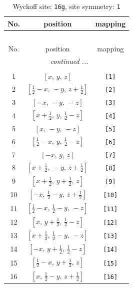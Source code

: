 \documentclass[fleqn,8pt]{jsarticle}
\begin{document}
\begin{longtable}{ccc}
\caption{Wyckoff site: {\tt 16g}, site symmetry: {\tt 1}}
 \\
 \hline \hline
No. & position & mapping \\ \hline \endfirsthead

\multicolumn{2}{l}{\tablename\ \thetable{}} \\
 \hline \hline
No. & position & mapping \\ \hline \endhead

 \hline \hline
\multicolumn{2}{r}{\footnotesize\it continued ...} \\ \endfoot

 \hline \hline
\multicolumn{2}{r}{} \\ \endlastfoot

1 & $\left[ x,\, y,\, z \right]$ & {\tt [1]} \\ \hline
2 & $\left[ \frac{1}{2} - x,\, - y,\, z + \frac{1}{2} \right]$ & {\tt [2]} \\ \hline
3 & $\left[ - x,\, - y,\, - z \right]$ & {\tt [3]} \\ \hline
4 & $\left[ x + \frac{1}{2},\, y,\, \frac{1}{2} - z \right]$ & {\tt [4]} \\ \hline
5 & $\left[ x,\, - y,\, - z \right]$ & {\tt [5]} \\ \hline
6 & $\left[ \frac{1}{2} - x,\, y,\, \frac{1}{2} - z \right]$ & {\tt [6]} \\ \hline
7 & $\left[ - x,\, y,\, z \right]$ & {\tt [7]} \\ \hline
8 & $\left[ x + \frac{1}{2},\, - y,\, z + \frac{1}{2} \right]$ & {\tt [8]} \\ \hline
9 & $\left[ x + \frac{1}{2},\, y + \frac{1}{2},\, z \right]$ & {\tt [9]} \\ \hline
10 & $\left[ - x,\, \frac{1}{2} - y,\, z + \frac{1}{2} \right]$ & {\tt [10]} \\ \hline
11 & $\left[ \frac{1}{2} - x,\, \frac{1}{2} - y,\, - z \right]$ & {\tt [11]} \\ \hline
12 & $\left[ x,\, y + \frac{1}{2},\, \frac{1}{2} - z \right]$ & {\tt [12]} \\ \hline
13 & $\left[ x + \frac{1}{2},\, \frac{1}{2} - y,\, - z \right]$ & {\tt [13]} \\ \hline
14 & $\left[ - x,\, y + \frac{1}{2},\, \frac{1}{2} - z \right]$ & {\tt [14]} \\ \hline
15 & $\left[ \frac{1}{2} - x,\, y + \frac{1}{2},\, z \right]$ & {\tt [15]} \\ \hline
16 & $\left[ x,\, \frac{1}{2} - y,\, z + \frac{1}{2} \right]$ & {\tt [16]} \\
\end{longtable}
\end{document}
